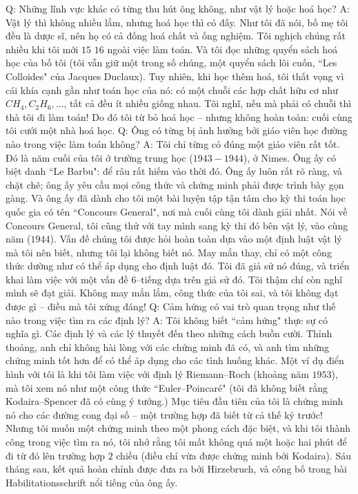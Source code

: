 \begin{multicols}{2}
	\vskip 0.1cm
	Q: Những lĩnh vực khác có từng thu hút ông không, như vật lý hoặc hoá học?
	\vskip 0.1cm
	A: Vật lý thì không nhiều lắm, nhưng hoá học thì có đấy. Như tôi đã nói, bố mẹ tôi đều là dược sĩ, nên họ có cả đống hoá chất và ống nghiệm. Tôi nghịch chúng rất nhiều khi tôi mới $15$ $16$ ngoài việc làm toán. Và tôi đọc những quyển sách hoá học của bố tôi (tôi vẫn giữ một trong số chúng, một quyển sách lôi cuốn, ``Les Colloides" của Jacques Duclaux). Tuy nhiên, khi học thêm hoá, tôi thất vọng vì cái khía cạnh gần như toán học của nó: có một chuỗi các hợp chất hữu cơ như $CH_4,C_2H_6,...$, tất cả đều ít nhiều giống nhau. Tôi nghĩ, nếu mà phải có chuỗi thì thà tôi đi làm toán! Do đó tôi từ bỏ hoá học -- nhưng không hoàn toàn: cuối cùng tôi cưới một nhà hoá học.
	\vskip 0.1cm
	Q: Ông có từng bị ảnh hưởng bởi giáo viên học đường nào trong việc làm toán không?
	\vskip 0.1cm
	A: Tôi chỉ từng có đúng một giáo viên rất tốt. Đó là năm cuối của tôi ở trường trung học ($1943-1944$), ở Nimes. Ông ấy có biệt danh ``Le Barbu": để râu rất hiếm vào thời đó. Ông ấy luôn rất rõ ràng, và chặt chẽ; ông ấy yêu cầu mọi công thức và chứng minh phải được trình bày gọn gàng. Và ông ấy đã dành cho tôi một bài luyện tập tận tâm cho kỳ thi toán học quốc gia có tên ``Concours General", nơi mà cuối cùng tôi dành giải nhất.
	\vskip 0.1cm
	Nói về Concours General, tôi cũng thử với tay mình sang kỳ thi đó bên vật lý, vào cùng năm ($1944$). Vấn đề chúng tôi được hỏi hoàn toàn dựa vào một định luật vật lý mà tôi nên biết, nhưng tôi lại không biết nó. May mắn thay, chỉ có một công thức dường như có thể áp dụng cho định luật đó. Tôi đã giả sử nó đúng, và triển khai làm việc với một vấn đề $6$--tiếng dựa trên giả sử đó. Tôi thậm chí còn nghĩ mình sẽ đạt giải. Không may mắn lắm, công thức của tôi sai, và tôi không đạt được gì -- điều mà tôi xứng đáng!
	\vskip 0.1cm
	Q: Cảm hứng có vai trò quan trọng như thế nào trong việc tìm ra các định lý?
	\vskip 0.1cm
	A: Tôi không biết ``cảm hứng" thực sự có nghĩa gì. Các định lý và các lý thuyết đến theo những cách buồn cười. Thỉnh thoảng, anh chỉ không hài lòng với các chứng minh đã có, và anh tìm những chứng minh tốt hơn để có thể áp dụng cho các tình huống khác. Một ví dụ điển hình với tôi là khi tôi làm việc với định lý Riemann--Roch (khoảng năm $1953$), mà tôi xem nó như một công thức ``Euler--Poincaré" (tôi đã không biết rằng Kodaira--Spencer đã có cùng ý tưởng.) Mục tiêu đầu tiên của tôi là chứng minh nó cho các đường cong đại số -- một trường hợp đã biết từ cả thế kỷ trước! Nhưng tôi muốn một chứng minh theo một phong cách đặc biệt, và khi tôi thành công trong việc tìm ra nó, tôi nhớ rằng tôi mất không quá một hoặc hai phút để đi từ đó lên trường hợp $2$ chiều (điều chỉ vừa được chứng minh bởi Kodaira). Sáu tháng sau, kết quả hoàn chỉnh được đưa ra bởi Hirzebruch, và công bố trong bài Habilitationsschrift nổi tiếng của ông ấy.

\end{multicols}
